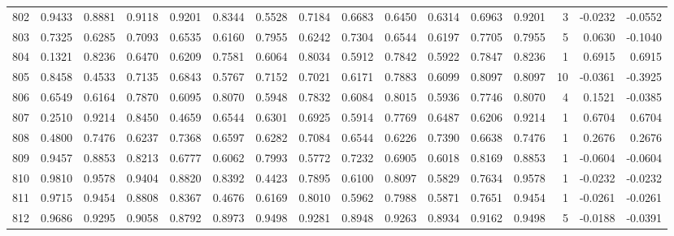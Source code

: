 \begin{tabular}{lrrrrrrrrrrrrrrr}
802 &      0.9433 &  0.8881 &  0.9118 &  0.9201 &  0.8344 &  0.5528 &  0.7184 &  0.6683 &  0.6450 &  0.6314 &   0.6963 &     0.9201 &      3 &                   -0.0232 &                    -0.0552 \\
803 &      0.7325 &  0.6285 &  0.7093 &  0.6535 &  0.6160 &  0.7955 &  0.6242 &  0.7304 &  0.6544 &  0.6197 &   0.7705 &     0.7955 &      5 &                    0.0630 &                    -0.1040 \\
804 &      0.1321 &  0.8236 &  0.6470 &  0.6209 &  0.7581 &  0.6064 &  0.8034 &  0.5912 &  0.7842 &  0.5922 &   0.7847 &     0.8236 &      1 &                    0.6915 &                     0.6915 \\
805 &      0.8458 &  0.4533 &  0.7135 &  0.6843 &  0.5767 &  0.7152 &  0.7021 &  0.6171 &  0.7883 &  0.6099 &   0.8097 &     0.8097 &     10 &                   -0.0361 &                    -0.3925 \\
806 &      0.6549 &  0.6164 &  0.7870 &  0.6095 &  0.8070 &  0.5948 &  0.7832 &  0.6084 &  0.8015 &  0.5936 &   0.7746 &     0.8070 &      4 &                    0.1521 &                    -0.0385 \\
807 &      0.2510 &  0.9214 &  0.8450 &  0.4659 &  0.6544 &  0.6301 &  0.6925 &  0.5914 &  0.7769 &  0.6487 &   0.6206 &     0.9214 &      1 &                    0.6704 &                     0.6704 \\
808 &      0.4800 &  0.7476 &  0.6237 &  0.7368 &  0.6597 &  0.6282 &  0.7084 &  0.6544 &  0.6226 &  0.7390 &   0.6638 &     0.7476 &      1 &                    0.2676 &                     0.2676 \\
809 &      0.9457 &  0.8853 &  0.8213 &  0.6777 &  0.6062 &  0.7993 &  0.5772 &  0.7232 &  0.6905 &  0.6018 &   0.8169 &     0.8853 &      1 &                   -0.0604 &                    -0.0604 \\
810 &      0.9810 &  0.9578 &  0.9404 &  0.8820 &  0.8392 &  0.4423 &  0.7895 &  0.6100 &  0.8097 &  0.5829 &   0.7634 &     0.9578 &      1 &                   -0.0232 &                    -0.0232 \\
811 &      0.9715 &  0.9454 &  0.8808 &  0.8367 &  0.4676 &  0.6169 &  0.8010 &  0.5962 &  0.7988 &  0.5871 &   0.7651 &     0.9454 &      1 &                   -0.0261 &                    -0.0261 \\
812 &      0.9686 &  0.9295 &  0.9058 &  0.8792 &  0.8973 &  0.9498 &  0.9281 &  0.8948 &  0.9263 &  0.8934 &   0.9162 &     0.9498 &      5 &                   -0.0188 &                    -0.0391 \\

\end{tabular}
